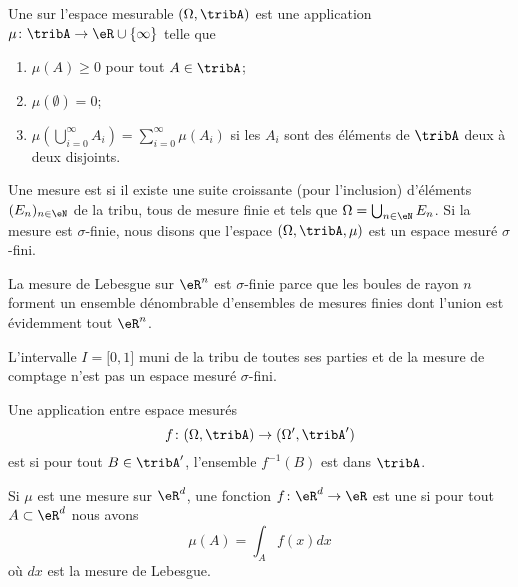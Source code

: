 \begin{definition}
    Une  sur l'espace mesurable \( (\Omega,\tribA)\) est une application \( \mu\colon \tribA\to \eR\cup\{ \infty \}\) telle que
    \begin{enumerate}
        \item
            \( \mu(A)\geq 0\) pour tout \( A\in\tribA\);
        \item
            \( \mu(\emptyset)=0\);
        \item
            \( \mu\left( \bigcup_{i=0}^{\infty}A_i\right)=\sum_{i=0}^{\infty}\mu(A_i)\) si les \( A_i\) sont des éléments de \( \tribA\) deux à deux disjoints.
    \end{enumerate}
    Une mesure est  si il existe une suite croissante (pour l'inclusion) d'éléments \( (E_n)_{n\in\eN}\) de la tribu, tous de mesure finie et tels que \( \Omega=\bigcup_{n\in \eN}E_n\). Si la mesure est $\sigma$-finie, nous disons que l'espace \( (\Omega,\tribA,\mu)\) est un espace mesuré $\sigma$-fini.
\end{definition}

\begin{example}
    La mesure de Lebesgue sur \( \eR^n\) est \( \sigma\)-finie parce que les boules de rayon \( n\) forment un ensemble dénombrable d'ensembles de mesures finies dont l'union est évidemment tout \( \eR^n\).

    L'intervalle \( I=\mathopen[ 0 , 1 \mathclose]\) muni de la tribu de toutes ses parties et de la mesure de comptage n'est pas un espace mesuré \( \sigma\)-fini.
\end{example}

\begin{definition}
    Une application entre espace mesurés
    \begin{equation}
        f\colon (\Omega,\tribA)\to (\Omega',\tribA')
    \end{equation}
    est  si pour tout \( B\in\tribA'\), l'ensemble \( f^{-1}(B)\) est dans \( \tribA\).
\end{definition}

Si \( \mu\) est une mesure sur \( \eR^d\), une fonction \( f\colon \eR^d\to \eR\) est une  si pour tout \( A\subset\eR^d\) nous avons
\begin{equation}
    \mu(A)=\int_Af(x)dx
\end{equation}
où \( dx\) est la mesure de Lebesgue.

